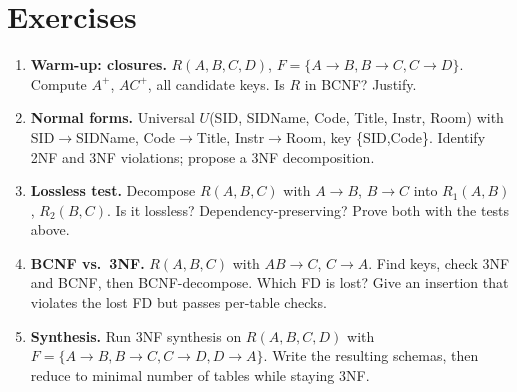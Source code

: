 \section{Exercises}
\label{sec:ch04-ex}
\begin{enumerate}[label=E4.\arabic*, leftmargin=*, itemsep=0.75em]
    \item \textbf{Warm-up: closures.} $R(A,B,C,D)$, $F=\{A\to B, B\to C, C\to D\}$. Compute $A^+$, $AC^+$, all candidate keys. Is $R$ in BCNF? Justify.
    \item \textbf{Normal forms.} Universal $U$(SID, SIDName, Code, Title, Instr, Room) with SID$\to$SIDName, Code$\to$Title, Instr$\to$Room, key \{SID,Code\}. Identify 2NF and 3NF violations; propose a 3NF decomposition.
    \item \textbf{Lossless test.} Decompose $R(A,B,C)$ with $A\to B$, $B\to C$ into $R_1(A,B)$, $R_2(B,C)$. Is it lossless? Dependency-preserving? Prove both with the tests above.
    \item \textbf{BCNF vs.\ 3NF.} $R(A,B,C)$ with $AB\to C$, $C\to A$. Find keys, check 3NF and BCNF, then BCNF-decompose. Which FD is lost? Give an insertion that violates the lost FD but passes per-table checks.
    \item \textbf{Synthesis.} Run 3NF synthesis on $R(A,B,C,D)$ with $F=\{A\to B, B\to C, C\to D, D\to A\}$. Write the resulting schemas, then reduce to minimal number of tables while staying 3NF.
\end{enumerate}

